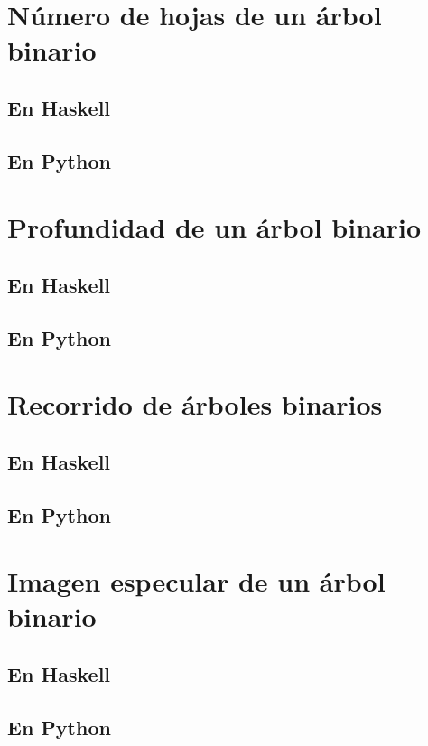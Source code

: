 \documentclass[a4paper,12pt,twoside]{book}
\begin{document}
\section{Número de hojas de un árbol binario}
\subsection*{En Haskell}
\subsection*{En Python}

\section{Profundidad de un árbol binario}
\subsection{En Haskell}
\subsection*{En Python}

\section{Recorrido de árboles binarios}
\subsection{En Haskell}
\subsection{En Python}

\section{Imagen especular de un árbol binario}
\subsection{En Haskell}
\subsection{En Python}
\end{document}
